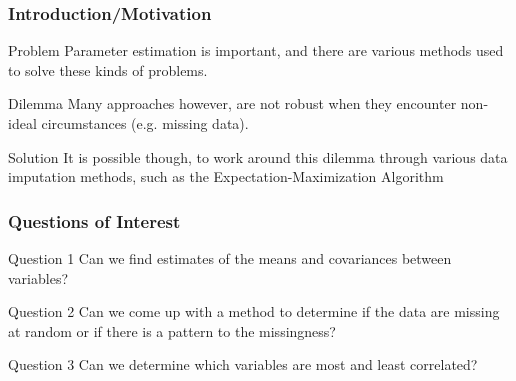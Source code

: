\documentclass{beamer}
\begin{document}
\begin{frame}
\frametitle{Introduction/Motivation}
\begin{block}{Problem}
Parameter estimation is important, and there are various methods used to solve these kinds of problems.
\end{block}

\begin{block}{Dilemma}
Many approaches however, are not robust when they encounter non-ideal circumstances (e.g. missing data).
\end{block}

\begin{block}{Solution}
It is possible though, to work around this dilemma through various data imputation methods, such as the Expectation-Maximization Algorithm
\end{block}
\end{frame}



\begin{frame}
\frametitle{Questions of Interest}

\begin{block}{Question 1}
Can we find estimates of the means and covariances between variables?
\end{block}

\begin{block}{Question 2}
Can we come up with a method to determine if the data are missing at random or if there is a pattern to the missingness?
\end{block}

\begin{block}{Question 3}
Can we determine which variables are most and least correlated?
\end{block}
\end{frame}
\end{document}
